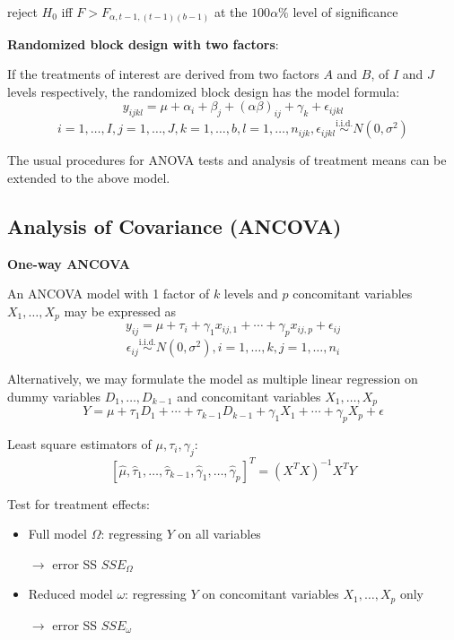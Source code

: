 \documentclass[11pt,a4paper]{article}
\begin{document}
reject $H_0$ iff $F > F_{\alpha, t-1, (t-1)(b-1)}$ at the $100\alpha\%$ level of significance \par

\textbf{Randomized block design with two factors}: \par
If the treatments of interest are derived from two factors $A$ and $B$, of $I$ and $J$ levels respectively, the randomized block design has the model formula:
\[
y_{ijkl} = \mu + \alpha_i + \beta_j + (\alpha \beta)_{ij} + \gamma_k + \epsilon_{ijkl}
\]
\[
i = 1, \dots, I, j = 1, \dots, J, k = 1, \dots, b, l = 1, \dots, n_{ijk}, \epsilon_{ijkl} \overset{\text{i.i.d.}}{\sim} N(0, \sigma^2)
\]

The usual procedures for ANOVA tests and analysis of treatment means can be extended to
the above model.

\subsection{Analysis of Covariance (ANCOVA)}
\textbf{One-way ANCOVA} \par
An ANCOVA model with 1 factor of $k$ levels and $p$ concomitant variables $X_1, \dots, X_p$ may be expressed as
\[
y_{ij} = \mu + \tau_i + \gamma_1 x_{ij,1} + \cdots + \gamma_p x_{ij,p} + \epsilon_{ij}
\]
\[
\epsilon_{ij} \overset{\text{i.i.d.}}{\sim} N(0, \sigma^2), i = 1, \dots, k, j = 1, \dots, n_i
\]

Alternatively, we may formulate the model as multiple linear regression on dummy variables $D_1, \dots, D_{k-1}$ and concomitant variables $X_1, \dots, X_p$
\[
Y = \mu + \tau_1 D_1 + \cdots + \tau_{k-1} D_{k-1} + \gamma_1 X_1 + \cdots + \gamma_p X_p + \epsilon
\]

Least square estimators of $\mu, \tau_i, \gamma_j$:
\[
\left[\hat{\mu}, \hat{\tau}_1, \dots, \hat{\tau}_{k-1}, \hat{\gamma}_1, \dots, \hat{\gamma}_p\right]^T = (X^TX)^{-1} X^T Y
\]

Test for treatment effects:
\begin{itemize}
    \item Full model $\Omega$: regressing $Y$ on all variables \par
        $\rightarrow$ error SS $SSE_{\Omega}$
    
    \item Reduced model $\omega$: regressing $Y$ on concomitant variables $X_1, \dots, X_p$ only \par
        $\rightarrow$ error SS $SSE_{\omega}$

\end{itemize}
\end{document}
